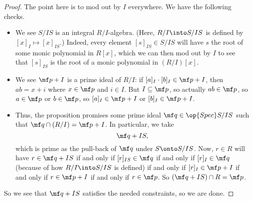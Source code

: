 \begin{proof}
	The point here is to mod out by $I$ everywhere. We have the following checks.
	\begin{itemize}
		\item We see $S/IS$ is an integral $R/I$-algebra. (Here, $R/I\into S/IS$ is defined by $[x]_I\mapsto[x]_{IS}$.) Indeed, every element $[s]_{IS}\in S/IS$ will have $s$ the root of some monic polynomial in $R[x]$, which we can then mod out by $I$ to see that $[s]_{IS}$ is the root of a monic polynomial in $(R/I)[x]$.
		\item We see $\mf p+I$ is a prime ideal of $R/I$: if $[a]_I\cdot[b]_I\in\mf p+I$, then $ab=x+i$ where $x\in\mf p$ and $i\in I$. But $I\subseteq\mf p$, so actually $ab\in\mf p$, so $a\in\mf p$ or $b\in\mf p$, so $[a]_I\in\mf p+I$ or $[b]_I\in\mf p+I$.
		\item Thus, the proposition promises some prime ideal $\mf q\in\op{Spec}S/IS$ such that $\mf q\cap(R/I)=\mf p+I$. In particular, we take
		\[\mf q+IS,\]
		which is prime as the pull-back of $\mf q$ under $S\onto S/IS$. Now, $r\in R$ will have $r\in\mf q+IS$ if and only if $[r]_{IS}\in\mf q$ if and only if $[r]_I\in\mf q$ (because of how $R/I\into S/IS$ is defined) if and only if $[r]_I\in\mf p+I$ if and only if $r\in\mf p+I$ if and only if $r\in\mf p$. So $(\mf q+IS)\cap R=\mf p$.
	\end{itemize}
	So we see that $\mf q+IS$ satisfies the needed constraints, so we are done.
\end{proof}

